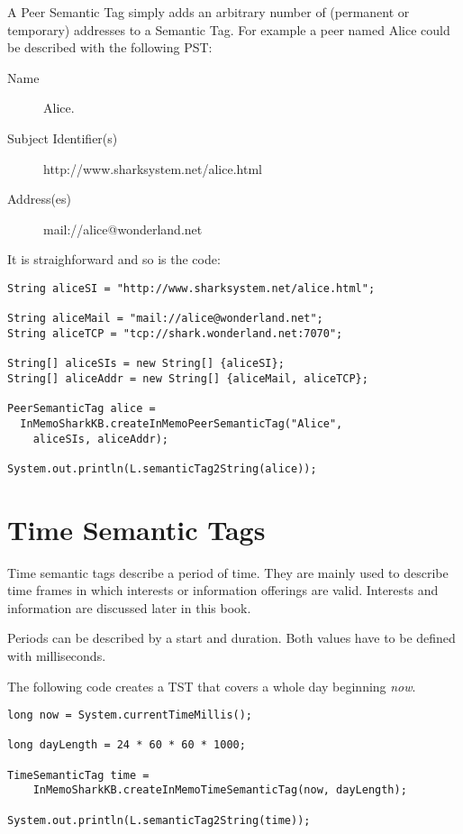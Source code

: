A Peer Semantic Tag simply adds an arbitrary number of (permanent or temporary) addresses to a Semantic Tag. For example a peer named Alice could be described with the following PST: 

\begin{description}
    \item[Name] Alice.
    \item[Subject Identifier(s)] http://www.sharksystem.net/alice.html
    \item[Address(es)] mail://alice@wonderland.net
\end{description}

It is straighforward and so is the code:

\begin{verbatim}
String aliceSI = "http://www.sharksystem.net/alice.html";

String aliceMail = "mail://alice@wonderland.net";
String aliceTCP = "tcp://shark.wonderland.net:7070";

String[] aliceSIs = new String[] {aliceSI};
String[] aliceAddr = new String[] {aliceMail, aliceTCP};

PeerSemanticTag alice = 
  InMemoSharkKB.createInMemoPeerSemanticTag("Alice", 
    aliceSIs, aliceAddr);

System.out.println(L.semanticTag2String(alice));
\end{verbatim}

\section{Time Semantic Tags}
Time semantic tags describe a period of time. They are mainly used to describe time frames in which interests or information offerings are valid. Interests and information are discussed later in this book.

Periods can be described by a start and duration. Both values have to be defined with milliseconds.

The following code creates a TST that covers a whole day beginning {\it now}.

\begin{verbatim}
long now = System.currentTimeMillis();

long dayLength = 24 * 60 * 60 * 1000; 

TimeSemanticTag time = 
    InMemoSharkKB.createInMemoTimeSemanticTag(now, dayLength);

System.out.println(L.semanticTag2String(time));
\end{verbatim}

